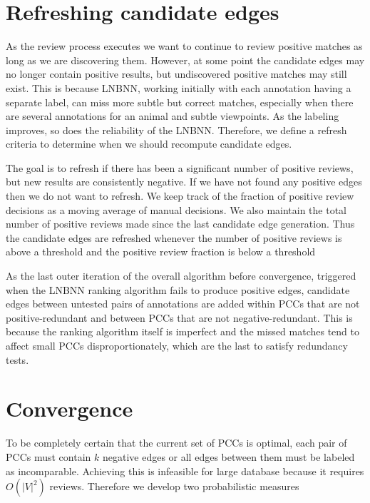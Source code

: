 \section{Refreshing candidate edges}\label{sec:refresh}

As the review process executes we want to continue to review positive matches as long as we are discovering them.
However, at some point the candidate edges may no longer contain positive results, but undiscovered positive matches may
still exist. This is because LNBNN, working initially with each annotation having a separate label, can miss more subtle
but correct matches, especially when there are several annotations for an animal and subtle viewpoints. As the labeling
improves, so does the reliability of the LNBNN. Therefore, we define a refresh criteria to determine when we should
recompute candidate edges.

The goal is to refresh if there has been a significant number of positive reviews, but new results are consistently
negative. If we have not found any positive edges then we do not want to refresh. We keep track of the fraction of
positive review decisions as a moving average of manual decisions. We also maintain the total number of positive reviews
made since the last candidate edge generation. Thus the candidate edges are refreshed whenever the number of positive
reviews is above a threshold and the positive review fraction is below a threshold

As the last outer iteration of the overall algorithm before convergence, triggered when the LNBNN ranking algorithm
fails to produce positive edges, candidate edges between untested pairs of annotations are added within PCCs that are
not positive-redundant and between PCCs that are not negative-redundant. This is because the ranking algorithm itself is
imperfect and the missed matches tend to affect small PCCs disproportionately, which are the last to satisfy redundancy
tests.


\section{Convergence}\label{sec:coverge}

To be completely certain that the current set of PCCs is optimal, each pair of
PCCs must contain $k$ negative edges or all edges between them must be labeled
as incomparable. Achieving this is infeasible for large database because it
requires $O(|V|^2)$ reviews. Therefore we develop two probabilistic measures 


